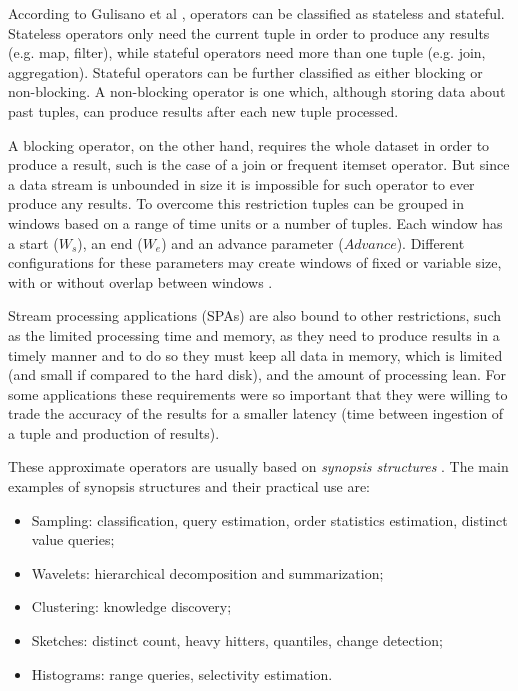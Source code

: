 \documentclass[ppgc,diss,english]{iiufrgs}
\begin{document}
According to Gulisano et al \cite{gulisano2010streamcloud}, operators can be classified as stateless and stateful. Stateless operators only need the current tuple in order to produce any results (e.g. map, filter), while stateful operators need more than one tuple (e.g. join, aggregation). Stateful operators can be further classified as either blocking or non-blocking. A non-blocking operator is one which, although storing data about past tuples, can produce results after each new tuple processed.

A blocking operator, on the other hand, requires the whole dataset in order to produce a result, such is the case of a join or frequent itemset operator. But since a data stream is unbounded in size it is impossible for such operator to ever produce any results. To overcome this restriction tuples can be grouped in windows based on a range of time units or a number of tuples. Each window has a start ($W_s$), an end ($W_e$) and an advance parameter ($Advance$). Different configurations for these parameters may create windows of fixed or variable size, with or without overlap between windows \cite{gulisano2012streamcloud}.

Stream processing applications (SPAs) are also bound to other restrictions, such as the limited processing time and memory, as they need to produce results in a timely manner and to do so they must keep all data in memory, which is limited (and small if compared to the hard disk), and the amount of processing lean. For some applications these requirements were so important that they were willing to trade the accuracy of the results for a smaller latency (time between ingestion of a tuple and production of results).

These approximate operators are usually based on \emph{synopsis structures} \cite{aggarwal2007survey}. The main examples of synopsis structures and their practical use are:

\begin{itemize}
\item Sampling: classification, query estimation, order statistics estimation, distinct value queries;
\item Wavelets: hierarchical decomposition and summarization;
\item Clustering: knowledge discovery;
\item Sketches: distinct count, heavy hitters, quantiles, change detection;
\item Histograms: range queries, selectivity estimation.
\end{itemize}
\end{document}
